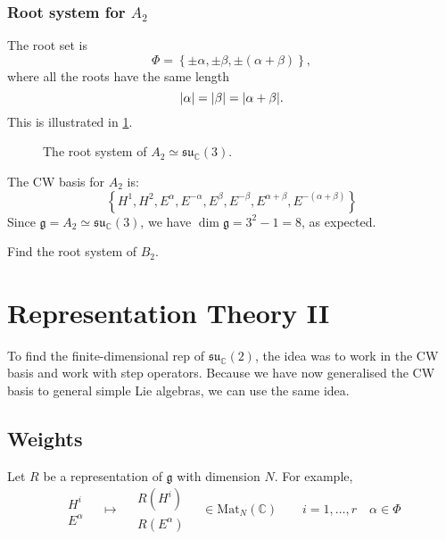 \begin{example}[$\mathfrak{g} = A_2$]
  \subsection*{Root system for $A_2$}%
  The root set is
  \begin{equation}
    \Phi = \left\{ \pm \alpha, \pm \beta, \pm (\alpha + \beta) \right\},
  \end{equation}
  where all the roots have the same length
  \begin{equation}
    \abs{\alpha} = \abs{\beta} = \abs{\alpha + \beta}.
  \end{equation}
  This is illustrated in \ref{fig:l21f2}.
  \begin{figure}[tbhp]
    \centering
    \def\svgwidth{0.4\columnwidth}
    
    \caption{The root system of $A_2 \simeq \mathfrak{su}_{\mathbb{C}}(3)$.}
    \label{fig:l21f2}
  \end{figure}

  The CW basis for $A_2$ is:
  \begin{equation}
    \left\{ H^1, H^2, E^{\alpha}, E^{-\alpha}, E^{\beta}, E^{-\beta}, E^{\alpha + \beta}, E^{-(\alpha + \beta)} \right\}
  \end{equation}
  Since $\mathfrak{g} = A_2 \simeq \mathfrak{su}_{\mathbb{C}}(3)$, we have $\dim \mathfrak{g} = 3^2 - 1 = 8$, as expected.
\end{example}  

\begin{exercise}
  Find the root system of $B_2$.
\end{exercise}

\chapter{Representation Theory II}%
\label{cha:representation_theory_ii}

To find the finite-dimensional rep of $\mathfrak{su}_{\mathbb{C}}(2)$, the idea was to work in the CW basis and work with step operators.
Because we have now generalised the CW basis to general simple Lie algebras, we can use the same idea.

\section{Weights}%
\label{sec:weights}

Let $R$ be a representation of $\mathfrak{g}$ with dimension $N$.
For example, 
\begin{equation}
  \begin{gathered}
    H^i \\
    E^{\alpha}
  \end{gathered}
  \quad \mapsto \quad
  \begin{gathered}
    R(H^i) \\
    R(E^\alpha)
  \end{gathered}
  \quad \in \text{Mat}_N(\mathbb{C})
  \qquad i = 1, \dots, r \quad \alpha \in \Phi
\end{equation}

